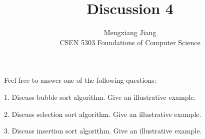 \documentclass[12pt]{article}
\newenvironment{problem}[2][Problem]{\begin{trivlist}
\item[\hskip \labelsep {\bfseries #1}\hskip \labelsep {\bfseries #2.}]}{\end{trivlist}}
\begin{document}
 
 
\title{Discussion 4}%
\author{Mengxiang Jiang\\ %
CSEN 5303 Foundations of Computer Science} %
 
\maketitle
 
\begin{problem}{statement} %
Feel free to answer one of the following questions:

1. Discuss bubble sort algorithm. Give an illustrative example.

2. Discuss selection sort algorithm. Give an illustrative example.

3. Discuss insertion sort algorithm. Give an illustrative example.
\end{problem}
 
\end{document}
